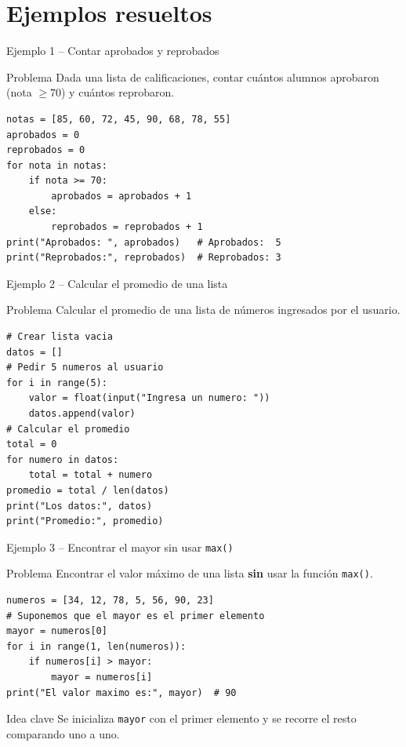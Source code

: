 \documentclass[aspectratio=169,xcolor=dvipsnames]{beamer}
\begin{document}
\section{Ejemplos resueltos}

\begin{frame}[fragile]{Ejemplo 1 -- Contar aprobados y reprobados}
    \begin{exampleblock}{Problema}
        Dada una lista de calificaciones, contar cuántos alumnos aprobaron (nota $\geq 70$) y cuántos reprobaron.
    \end{exampleblock}
\begin{lstlisting}[style=PythonStyle]
notas = [85, 60, 72, 45, 90, 68, 78, 55]
aprobados = 0
reprobados = 0
for nota in notas:
    if nota >= 70:
        aprobados = aprobados + 1
    else:
        reprobados = reprobados + 1
print("Aprobados: ", aprobados)   # Aprobados:  5
print("Reprobados:", reprobados)  # Reprobados: 3
\end{lstlisting}
\end{frame}

\begin{frame}[fragile]{Ejemplo 2 -- Calcular el promedio de una lista}
    \begin{exampleblock}{Problema}
        Calcular el promedio de una lista de números ingresados por el usuario.
    \end{exampleblock}
\begin{lstlisting}[style=PythonStyle]
# Crear lista vacia
datos = []
# Pedir 5 numeros al usuario
for i in range(5):
    valor = float(input("Ingresa un numero: "))
    datos.append(valor)
# Calcular el promedio
total = 0
for numero in datos:
    total = total + numero
promedio = total / len(datos)
print("Los datos:", datos)
print("Promedio:", promedio)
\end{lstlisting}
\end{frame}

\begin{frame}[fragile]{Ejemplo 3 -- Encontrar el mayor sin usar \texttt{max()}}
    \begin{exampleblock}{Problema}
        Encontrar el valor máximo de una lista \textbf{sin} usar la función \texttt{max()}.
    \end{exampleblock}
\begin{lstlisting}[style=PythonStyle]
numeros = [34, 12, 78, 5, 56, 90, 23]
# Suponemos que el mayor es el primer elemento
mayor = numeros[0]
for i in range(1, len(numeros)):
    if numeros[i] > mayor:
        mayor = numeros[i]
print("El valor maximo es:", mayor)  # 90
\end{lstlisting}
    \begin{block}{Idea clave}
        Se inicializa \texttt{mayor} con el primer elemento y se recorre el resto comparando uno a uno.
    \end{block}
\end{frame}
\end{document}
